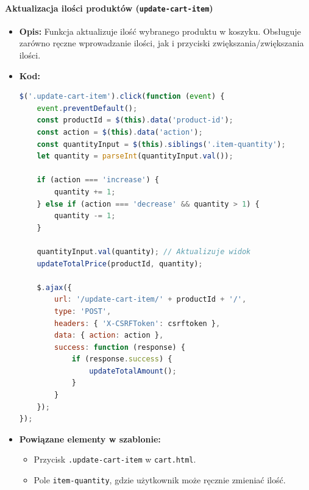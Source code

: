 \documentclass[12pt,a4paper,oneside]{article}
\theoremstyle{definition}
\numberwithin{equation}{section}
\begin{document}
\paragraph{Aktualizacja ilości produktów (\texttt{update-cart-item})}
\begin{itemize}
    \item \textbf{Opis:}  
    Funkcja aktualizuje ilość wybranego produktu w koszyku. Obsługuje zarówno ręczne wprowadzanie ilości, jak i przyciski zwiększania/zwiększania ilości.
    \item \textbf{Kod:}
\begin{lstlisting}[language=JavaScript, caption=Kod funkcji update-cart-item]
$('.update-cart-item').click(function (event) {
    event.preventDefault();
    const productId = $(this).data('product-id');
    const action = $(this).data('action');
    const quantityInput = $(this).siblings('.item-quantity');
    let quantity = parseInt(quantityInput.val());

    if (action === 'increase') {
        quantity += 1;
    } else if (action === 'decrease' && quantity > 1) {
        quantity -= 1;
    }

    quantityInput.val(quantity); // Aktualizuje widok
    updateTotalPrice(productId, quantity);

    $.ajax({
        url: '/update-cart-item/' + productId + '/',
        type: 'POST',
        headers: { 'X-CSRFToken': csrftoken },
        data: { action: action },
        success: function (response) {
            if (response.success) {
                updateTotalAmount(); 
            }
        }
    });
});
\end{lstlisting}
    \item \textbf{Powiązane elementy w szablonie:}
    \begin{itemize}
        \item Przycisk \texttt{.update-cart-item} w \texttt{cart.html}.
        \item Pole \texttt{item-quantity}, gdzie użytkownik może ręcznie zmieniać ilość.
    \end{itemize}
\end{itemize}
\end{document}
